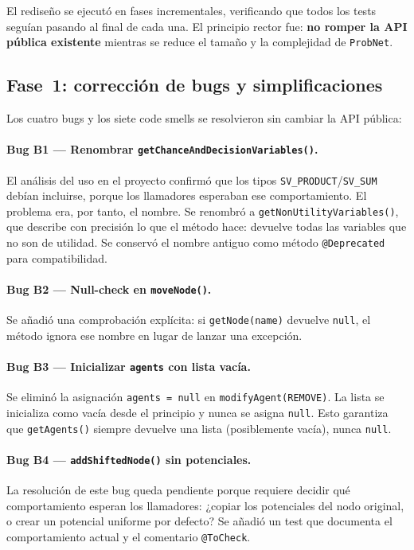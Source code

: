 \documentclass[11pt,a4paper]{article}
\newcommand{\code}[1]{\texttt{#1}}
\begin{document}
El rediseño se ejecutó en fases incrementales, verificando que todos los
tests seguían pasando al final de cada una.  El principio rector fue:
\textbf{no romper la API pública existente} mientras se reduce el tamaño
y la complejidad de \code{ProbNet}.

\subsection{Fase~1: corrección de bugs y simplificaciones}
\label{sec:fase1}

Los cuatro bugs y los siete code smells se resolvieron sin cambiar la
API pública:

\paragraph{Bug B1 --- Renombrar \texttt{getChanceAndDecisionVariables()}.}
El análisis del uso en el proyecto confirmó que los tipos
\code{SV\_PRODUCT}/\code{SV\_SUM} debían incluirse, porque los llamadores
esperaban ese comportamiento.  El problema era, por tanto, el nombre.
Se renombró a \code{getNonUtilityVariables()}, que describe con precisión
lo que el método hace: devuelve todas las variables que no son de
utilidad.  Se conservó el nombre antiguo como método \code{@Deprecated}
para compatibilidad.

\paragraph{Bug B2 --- Null-check en \texttt{moveNode()}.}
Se añadió una comprobación explícita: si \code{getNode(name)} devuelve
\code{null}, el método ignora ese nombre en lugar de lanzar una excepción.

\paragraph{Bug B3 --- Inicializar \texttt{agents} con lista vacía.}
Se eliminó la asignación \code{agents = null} en
\code{modifyAgent(REMOVE)}.  La lista se inicializa como vacía desde el
principio y nunca se asigna \code{null}.  Esto garantiza que
\code{getAgents()} siempre devuelve una lista (posiblemente vacía),
nunca \code{null}.

\paragraph{Bug B4 --- \texttt{addShiftedNode()} sin potenciales.}
La resolución de este bug queda pendiente porque requiere decidir qué
comportamiento esperan los llamadores: ¿copiar los potenciales del nodo
original, o crear un potencial uniforme por defecto?  Se añadió un test
que documenta el comportamiento actual y el comentario \code{@ToCheck}.
\end{document}
